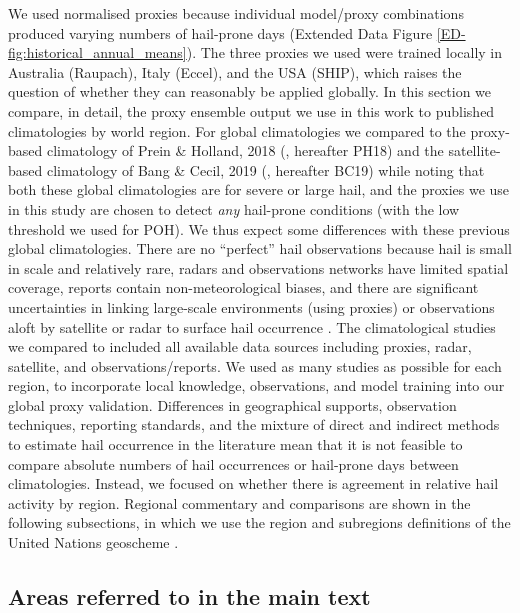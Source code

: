 \documentclass[pdflatex, sn-nature]{sn-jnl}\usepackage[]{graphicx}\usepackage[]{xcolor}
\begin{document}
We used normalised proxies because individual model/proxy combinations produced
varying numbers of hail-prone days (Extended Data Figure
\ref{ED-fig:historical_annual_means}). The three proxies we used were trained
locally in Australia (Raupach), Italy (Eccel), and the USA (SHIP), which raises
the question of whether they can reasonably be applied globally. In this section
we compare, in detail, the proxy ensemble output we use in this work to
published climatologies by world region. For global climatologies we compared to
the proxy-based climatology of Prein \& Holland, 2018 (\cite{Prein_WCE_2018},
hereafter PH18) and the satellite-based climatology of Bang \& Cecil, 2019
(\cite{Bang_JAMC_2019}, hereafter BC19) while noting that both these global
climatologies are for severe or large hail, and the proxies we use in this study
are chosen to detect \textit{any} hail-prone conditions (with the low threshold
we used for POH). We thus expect some differences with these previous global
climatologies. There are no ``perfect'' hail observations because hail is small
in scale and relatively rare, radars and observations networks have limited
spatial coverage, reports contain non-meteorological biases, and there are
significant uncertainties in linking large-scale environments (using proxies) or
observations aloft by satellite or radar to surface hail occurrence
\citep{Raupach_NREE_2021}. The climatological studies we compared to included
all available data sources including proxies, radar, satellite, and
observations/reports. We used as many studies as possible for each region, to
incorporate local knowledge, observations, and model training into our global
proxy validation. Differences in geographical supports, observation techniques,
reporting standards, and the mixture of direct and indirect methods to estimate
hail occurrence in the literature mean that it is not feasible to compare
absolute numbers of hail occurrences or hail-prone days between climatologies.
Instead, we focused on whether there is agreement in relative hail activity by
region. Regional commentary and comparisons are shown in the following
subsections, in which we use the region and subregions definitions of the United
Nations geoscheme \citep{UN_geoscheme}.

\subsection{Areas referred to in the main text}
\label{sec:regions}
\end{document}

